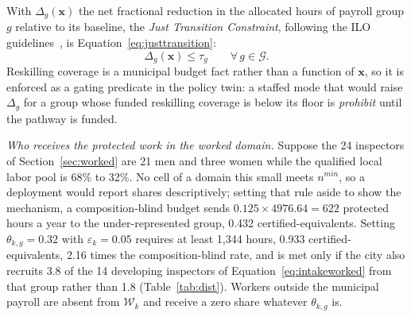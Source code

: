 \documentclass[utf8]{frontiers_suppmat}
\begin{document}
With $\Delta_g(\mathbf{x})$ the net fractional reduction in the allocated hours of payroll group $g$ relative to its baseline, the \textit{Just Transition Constraint}, following the ILO guidelines~\citep{ILO2015}, is Equation~\eqref{eq:justtransition}:
\begin{equation}
	\Delta_g(\mathbf{x}) \leq \tau_g \qquad \forall\, g \in \mathcal{G}.
	\label{eq:justtransition}
\end{equation}
Reskilling coverage is a municipal budget fact rather than a function of $\mathbf{x}$, so it is enforced as a gating predicate in the policy twin: a staffed mode that would raise $\Delta_g$ for a group whose funded reskilling coverage is below its floor is \textit{prohibit} until the pathway is funded.

\textit{Who receives the protected work in the worked domain.} Suppose the 24 inspectors of Section~\ref{sec:worked} are 21 men and three women while the qualified local labor pool is 68\% to 32\%. No cell of a domain this small meets $n^{min}$, so a deployment would report shares descriptively; setting that rule aside to show the mechanism, a composition-blind budget sends $0.125\times4976.64=622$ protected hours a year to the under-represented group, 0.432 certified-equivalents. Setting $\theta_{k,g}=0.32$ with $\varepsilon_k=0.05$ requires at least 1{,}344 hours, 0.933 certified-equivalents, 2.16 times the composition-blind rate, and is met only if the city also recruits 3.8 of the 14 developing inspectors of Equation~\eqref{eq:intakeworked} from that group rather than 1.8 (Table~\ref{tab:dist}). Workers outside the municipal payroll are absent from $\mathcal{W}_k$ and receive a zero share whatever $\theta_{k,g}$ is.
\end{document}

